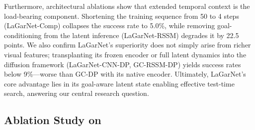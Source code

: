 \documentclass[journal]{IEEEtran}
\newif\ifshowrev\showrevtrue
\newcommand{\rev}[1]{\ifshowrev\textcolor{revblue}{#1}\else#1\fi}
\begin{document}
\rev{Furthermore, architectural ablations show that extended temporal context is the load-bearing component. Shortening the training sequence from 50 to 4 steps (LaGarNet-Comp) collapses the success rate to 5.0\%, while removing goal-conditioning from the latent inference (LaGarNet-RSSM) degrades it by 22.5 points. We also confirm LaGarNet's superiority does not simply arise from richer visual features; transplanting its frozen encoder or full latent dynamics into the diffusion framework (LaGarNet-CNN-DP, GC-RSSM-DP) yields success rates below 9\%---worse than GC-DP with its native encoder. Ultimately, LaGarNet's core advantage lies in its goal-aware latent state enabling effective test-time search, answering our central research question.}

\subsection{Ablation Study on } \label{sec:abl}
\end{document}
